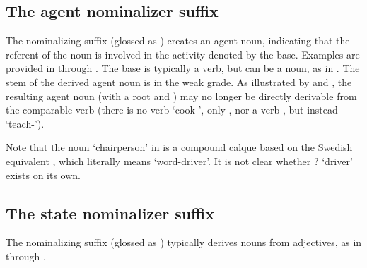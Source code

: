 \subsection{The agent nominalizer suffix }\label{agentNMLZ}
The nominalizing suffix  (glossed as ) creates an agent noun, indicating that the referent of the noun is involved in the activity denoted by the base. Examples are provided in  through . 
\ea\label{agentNMLZex1}
\z
\ea\label{agentNMLZex2}
\z
\ea\label{agentNMLZex3}
\z
\ea\label{agentNMLZex4}
\z
\ea\label{agentNMLZex5}
\z
The base is typically a verb, but can be a noun, as in . The stem of the derived agent noun is in the weak grade. 
As illustrated by  and , the resulting agent noun (with a root  and ) may no longer be directly derivable from the comparable verb (there is no verb  ‘cook-’, only , nor a verb , but instead  ‘teach-’). 

Note that the noun  ‘chairperson’ in  is a compound calque based on the Swedish equivalent , which literally means ‘word-driver’. It is not clear whether ? ‘driver’ exists on its own. 




\subsection{The state nominalizer suffix }\label{vuohta}
The nominalizing suffix  (glossed as ) typically derives nouns from adjectives, 
as in  through . 
\ea\label{vuohtaEx1}
\z
\ea\label{vuohtaEx2}
\z
\ea\label{vuohtaEx3}
\z

